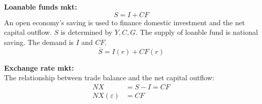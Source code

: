\documentclass[12pt]{article}
\begin{document}
{\textbf {Loanable funds mkt:}}\\
\begin{equation*}
S = I + CF
\end{equation*}
An open economy's saving is used to finance domestic investment and the net capital
outflow. $ S $ is determined by $ Y, C, G $. The supply of loanble fund is national
saving. The demand is $ I $ and $ CF $.
\begin{equation*}
 \overline{S} = I(r) + CF(r)
\end{equation*}




\begin{figure}[H]
\end{figure}




{\textbf {Exchange rate mkt:}}\\
The relationship between trade balance and the net capital outflow:
\begin{align*}
NX &= S - I = CF\\
NX(\varepsilon) &= CF
\end{align*}

\begin{figure}[H]
\end{figure}
\end{document}
